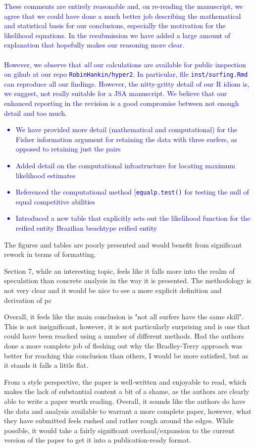 \documentclass[12pt]{article}
\begin{document}
\textcolor{blue}{These comments are entirely reasonable and, on
  re-reading the manuscript, we agree that we could have done a much
  better job describing the mathematical and statistical basis for our
  conclusions, especially the motivation for the likelihood equations.
  In the resubmission we have added a large amount of explanation that
  hopefully makes our reasoning more clear.\\ \\
  However, we observe that {\em all} our calculations are available
  for public inspection on gihub at our repo {\tt RobinHankin/hyper2}.
  In particular, file {\tt inst/surfing.Rmd} can reproduce all our
  findings.  However, the nitty-gritty detail of our R idiom is, we
  suggest, not really suitable for a JSA manuscript.  We believe that
  our enhanced reporting in the revision is a good compromise between
  not enough detail and too much.
  \begin{itemize}
  \item We have provided more detail (mathematical and computational)
    for the Fisher information argument for retaining the data with
    three surfers, as opposed to retaining just the pairs
  \item Added detail on the computational infrastructure for locating
    maximum likelihood estimates
  \item Referenced the computational method [{\tt equalp.test()} for
    testing the null of equal competitive abilities
  \item Introduced a new table that explicitly sets out the likelihood
    function for the reified entity Brazilian beachtype reified entity
  \end{itemize}
}

  
The figures and tables are poorly presented and would benefit from
significant rework in terms of formatting.

Section 7, while an interesting topic, feels like it falls more into
the realm of speculation than concrete analysis in the way it is
presented. The methodology is not very clear and it would be nice to
see a more explicit definition and derivation of pc

Overall, it feels like the main conclusion is "not all surfers have
the same skill". This is not insignificant, however, it is not
particularly surprising and is one that could have been reached using
a number of different methods. Had the authors done a more complete
job of fleshing out why the Bradley-Terry approach was better for
reaching this conclusion than others, I would be more satisfied, but
as it stands it falls a little flat.

From a style perspective, the paper is well-written and enjoyable to
read, which makes the lack of substantial content a bit of a shame, as
the authors are clearly able to write a paper worth reading. Overall,
it sounds like the authors do have the data and analysis available to
warrant a more complete paper, however, what they have submitted feels
rushed and rather rough around the edges. While possible, it would
take a fairly significant overhaul/expansion to the current version of
the paper to get it into a publication-ready format.
\end{document}
